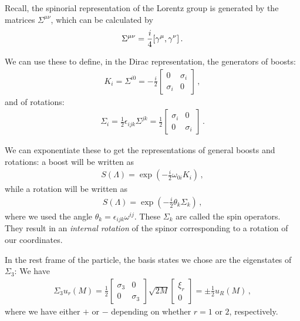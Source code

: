 \documentclass[main.tex]{subfiles}
\begin{document}
Recall, the spinorial representation of the Lorentz group is generated by the matrices \(\Sigma^{\mu \nu }\), which can be calculated by 
%
\begin{align}
\Sigma^{\mu \nu } = \frac{i}{4} \qty[\gamma^{\mu }, \gamma^{\nu }]
\,.
\end{align}

We can use these to define, in the Dirac representation, the generators of boosts: 
%
\begin{subequations}
\begin{align}
K_{i} = \Sigma^{i0} = -\frac{i}{2} \left[\begin{array}{cc}
0 & \sigma_{i} \\ 
\sigma_{i} & 0
\end{array}\right]
\,,
\end{align}
\end{subequations}
%
and of rotations: 
%
\begin{subequations}
\begin{align} \label{eq:rotation-spin-generator-definition}
\Sigma_{i} = \frac{1}{2} \epsilon_{ijk} \Sigma^{jk} 
= \frac{1}{2} \left[\begin{array}{cc}
\sigma_{i} & 0 \\ 
0 & \sigma_{i}
\end{array}\right]
\,.
\end{align}
\end{subequations}

We can exponentiate these to get the representations of general boosts and rotations: a boost will be written as 
%
\begin{align}
S(\Lambda) = \exp( - \frac{i}{2} \omega_{0i} K_{i} )
\,,
\end{align}
%
while a rotation will be written as 
%
\begin{align}
S(\Lambda ) = \exp( - \frac{i}{2} \theta_{k} \Sigma_{k})
\,,
\end{align}
%
where we used the angle \(\theta_{k} = \epsilon_{ijk} \omega^{ij}\).
These \(\Sigma_{k}\) are called the spin operators. They result in an \emph{internal rotation} of the spinor corresponding to a rotation of our coordinates.

In the rest frame of the particle, the basis states we chose are the eigenstates of \(\Sigma_{3}\): We have 
%
\begin{subequations}
\begin{align}
\Sigma_{3} u_r (M) = \frac{1}{2} \left[\begin{array}{cc}
\sigma_3  & 0 \\ 
0 & \sigma_3 
\end{array}\right]
\sqrt{2M}
\left[\begin{array}{c}
\xi_{r} \\ 
0
\end{array}\right]
= \pm \frac{1}{2} u_R (M)
\,,
\end{align}
\end{subequations}
%
where we have either \(+\) or \(-\) depending on whether \(r=1\) or \(2\), respectively.
\end{document}
